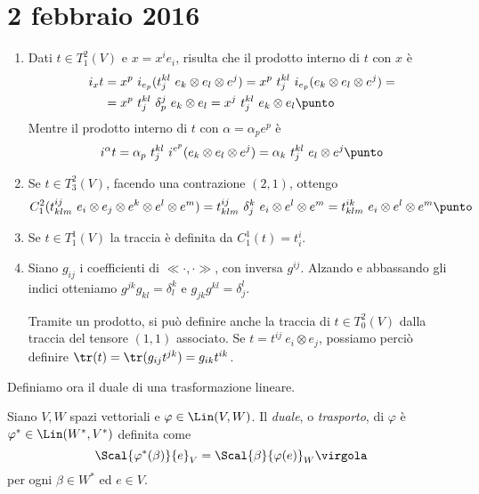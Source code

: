 \chapter{2 febbraio 2016}

\begin{example}
	\begin{enumerate}
		\item Dati $t\in T_1^2(V)$ e $x=x^ie_i$, risulta che il prodotto interno di $t$ con $x$ è 
		\begin{align*}
		i_xt &= x^p\ i_{e_p}(t_j^{kl}\ e_k\otimes e_l\otimes e^j) = x^p\ t_j^{kl}\ i_{e_p} (e_k\otimes e_l\otimes e^j) =\\
		&= x^p\ t_j^{kl}\ \delta_p^j\ e_k\otimes e_l = x^j\ t_j^{kl}\ e_k\otimes e_l \punto
		\end{align*}
		Mentre il prodotto interno di $t$ con $\alpha = \alpha_pe^p$ è
		\begin{align*}
		i^\alpha t = \alpha_p\ t_j^{kl}\ i^{e^p}(e_k\otimes e_l\otimes e^j) = \alpha_k\ t_j^{kl}\ e_l\otimes e^j \punto
		\end{align*}
		
		\item Se $t\in T_3^2(V)$, facendo una contrazione $(2,1)$, ottengo
		\begin{equation*}
			C_1^2 (t_{klm}^{ij}\ e_i\otimes e_j\otimes e^k\otimes e^l\otimes e^m ) = t_{klm}^{ij}\ \delta_j^k\ e_i\otimes e^l\otimes e^m = t_{klm}^{ik}\ e_i\otimes e^l\otimes e^m \punto
		\end{equation*}
		
		\item Se $t\in T_1^1(V)$ la traccia è definita da $C_1^1(t) = t_i^i$.

		\item Siano $g_{ij}$ i coefficienti di $\ll \cdot, \cdot \gg$, con inversa $g^{ij}$. Alzando e abbassando gli indici otteniamo $g^{jk}g_{kl} = \delta_l^k$ e $g_{jk}g^{kl} = \delta_j^l$.
		
		Tramite un prodotto, si può definire anche la traccia di $t\in T_0^2(V)$ dalla traccia del tensore $(1,1)$ associato. Se $t=t^{ij}\ e_i\otimes e_j$, possiamo perciò definire $\tr (t) = \tr (g_{ij}t^{jk}) = g_{ik}t^{ik}$.
	\end{enumerate}
\end{example}

Definiamo ora il duale di una trasformazione lineare.
\begin{definition}  
	Siano $V,W$ spazi vettoriali e $\varphi \in \Lin(V,W)$. Il \emph{duale}, o \emph{trasporto}, di $\varphi$ è $\varphi^* \in \Lin(W^*,V^*)$ definita come 
	\begin{equation*}
		\Scal{\varphi^*(\beta)}{e}_V = \Scal{\beta}{\varphi(e)}_W \virgola 
	\end{equation*}
	per ogni $\beta \in W^*$ ed $e\in V$.
\end{definition}

